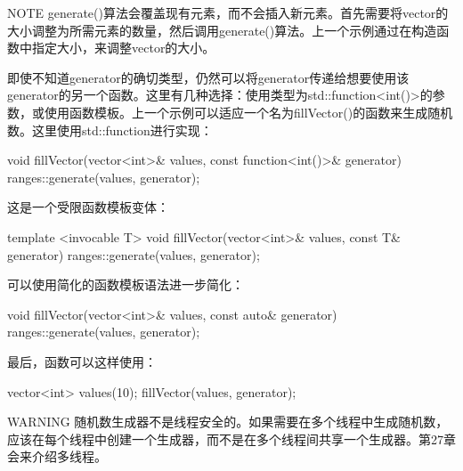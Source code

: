 \begin{myNotic}{NOTE}
generate()算法会覆盖现有元素，而不会插入新元素。首先需要将vector的大小调整为所需元素的数量，然后调用generate()算法。上一个示例通过在构造函数中指定大小，来调整vector的大小。
\end{myNotic}

即使不知道generator的确切类型，仍然可以将generator传递给想要使用该generator的另一个函数。这里有几种选择：使用类型为std::function<int()>的参数，或使用函数模板。上一个示例可以适应一个名为fillVector()的函数来生成随机数。这里使用std::function进行实现：

\begin{cpp}
void fillVector(vector<int>& values, const function<int()>& generator)
{
    ranges::generate(values, generator);
}
\end{cpp}

这是一个受限函数模板变体：

\begin{cpp}
template <invocable T>
void fillVector(vector<int>& values, const T& generator)
{
    ranges::generate(values, generator);
}
\end{cpp}

可以使用简化的函数模板语法进一步简化：

\begin{cpp}
void fillVector(vector<int>& values, const auto& generator)
{
    ranges::generate(values, generator);
}
\end{cpp}

最后，函数可以这样使用：

\begin{cpp}
vector<int> values(10);
fillVector(values, generator);
\end{cpp}

\begin{myWarning}{WARNING}
随机数生成器不是线程安全的。如果需要在多个线程中生成随机数，应该在每个线程中创建一个生成器，而不是在多个线程间共享一个生成器。第27章会来介绍多线程。
\end{myWarning}








